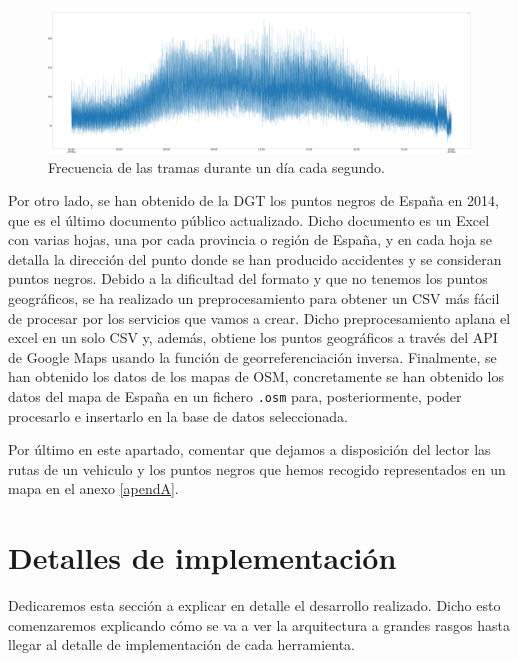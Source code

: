 \begin{figure}[htp]
\centering
\includegraphics[scale=0.26]{Imagenes/graf3.png}
\caption{Frecuencia de las tramas durante un día cada segundo.}
\label{graf1sec}
\end{figure}


Por otro lado, se han obtenido de la DGT los puntos negros de España en
2014, que es el último documento público actualizado. Dicho documento es un
Excel con varias hojas, una por cada provincia o región de España, y en
cada hoja se detalla la dirección del punto donde se han producido
accidentes y se consideran puntos negros. Debido a la dificultad del
formato y que no tenemos los puntos geográficos, se ha realizado un
preprocesamiento para obtener un CSV más fácil de procesar por los
servicios que vamos a crear. Dicho preprocesamiento aplana el excel en un
solo CSV y, además, obtiene los puntos geográficos a través del API de
Google Maps usando la función de georreferenciación inversa. Finalmente, se
han obtenido los datos de los mapas de OSM, concretamente se han obtenido
los datos del mapa de España en un fichero {\tt .osm} para, posteriormente,
poder procesarlo e insertarlo en la base de datos seleccionada.

Por último en este apartado, comentar que dejamos a disposición del lector
las rutas de un vehiculo y los puntos negros que hemos recogido
representados en un mapa en el anexo
\ref{apendA}. %

\section{Detalles de implementación\label{implementacion}}

Dedicaremos esta sección a explicar en detalle el desarrollo realizado.
Dicho esto comenzaremos explicando cómo se va a ver la arquitectura a
grandes rasgos hasta llegar al detalle de implementación de cada
herramienta.

